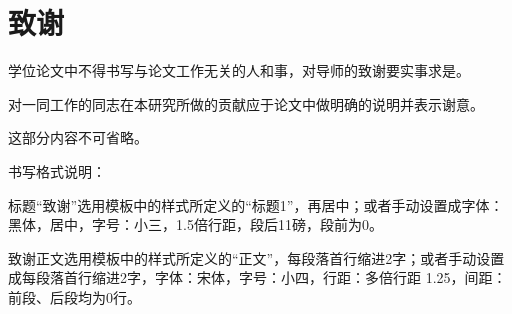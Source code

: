 \chapter*{致\quad 谢} %

学位论文中不得书写与论文工作无关的人和事，对导师的致谢要实事求是。

对一同工作的同志在本研究所做的贡献应于论文中做明确的说明并表示谢意。

这部分内容不可省略。

书写格式说明：

标题“致谢”选用模板中的样式所定义的“标题1”，再居中；或者手动设置成字体：黑体，居中，字号：小三，1.5倍行距，段后11磅，段前为0。

致谢正文选用模板中的样式所定义的“正文”，每段落首行缩进2字；或者手动设置成每段落首行缩进2字，字体：宋体，字号：小四，行距：多倍行距 1.25，间距：前段、后段均为0行。

